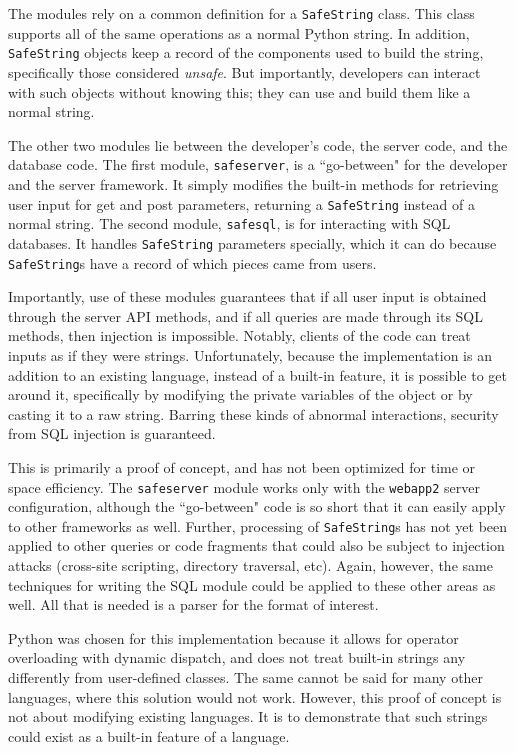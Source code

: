 \documentclass[twocolumn]{article}
\begin{document}
The modules rely on a common definition for a \verb;SafeString; class.  This class supports all of the same operations as a normal Python string.  In addition, \verb;SafeString; objects keep a record of the components used to build the string, specifically those considered \textit{unsafe}.  But importantly, developers can interact with such objects without knowing this; they can use and build them like a normal string.

The other two modules lie between the developer's code, the server code, and the database code.  The first module, \verb;safeserver;, is a ``go-between" for the developer and the server framework.  It simply modifies the built-in methods for retrieving user input for get and post parameters, returning a \verb;SafeString; instead of a normal string.  The second module, \verb;safesql;, is for interacting with SQL databases.  It handles \verb;SafeString; parameters specially, which it can do because \verb;SafeString;s have a record of which pieces came from users.

Importantly, use of these modules guarantees that if all user input is obtained through the server API methods, and if all queries are made through its SQL methods, then injection is impossible.  Notably, clients of the code can treat inputs as if they were strings.  Unfortunately, because the implementation is an addition to an existing language, instead of a built-in feature, it is possible to get around it, specifically by modifying the private variables of the object or by casting it to a raw string.  Barring these kinds of abnormal interactions, security from SQL injection is guaranteed.

This is primarily a proof of concept, and has not been optimized for time or space efficiency.  The \verb;safeserver; module works only with the \verb;webapp2; server configuration, although the ``go-between" code is so short that it can easily apply to other frameworks as well.  Further, processing of \verb;SafeString;s has not yet been applied to other queries or code fragments that could also be subject to injection attacks (cross-site scripting, directory traversal, etc).  Again, however, the same techniques for writing the SQL module could be applied to these other areas as well.  All that is needed is a parser for the format of interest.

Python was chosen for this implementation because it allows for operator overloading with dynamic dispatch, and does not treat built-in strings any differently from user-defined classes.  The same cannot be said for many other languages, where this solution would not work.  However, this proof of concept is not about modifying existing languages.  It is to demonstrate that such strings could exist as a built-in feature of a language.
\end{document}
